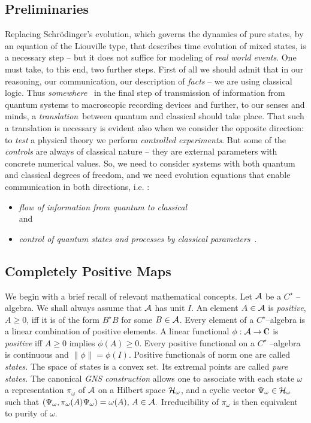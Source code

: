 \documentclass[12pt]{article}
\def\complex{{\kern .1em {\raise .47ex \hbox
{$\scriptscriptstyle
|$}}
\kern -.4em {\rm C}}}
\begin{document}
\subsection{Preliminaries}
Replacing Schr\"odinger's evolution, which governs the dynamics
of pure states, by an equation of the
Liouville type, that describes time evolution of mixed states,
is a necessary step -- but it does not suffice for modeling
of {\em real world events}.  One must take,  to this end,  two further steps. 
First of all we should admit that in our reasoning,  our communication,  our
description of {\em facts} -- we are using classical logic.  Thus {\em somewhere }\
in the final step of transmission of information from quantum systems to
macroscopic recording devices and further, to our senses and minds,
a {\em translation}\ between quantum and classical
 should
take place.  That such a translation is necessary is evident also when we
consider the opposite direction:  to {\em test} a physical theory we perform 
{\em controlled experiments}.  But some of the {\em controls} are always of
classical nature -- they are external parameters with concrete numerical
values.  So,  we need to consider systems with both quantum and classical
degrees of freedom,  and we need evolution equations that enable communication 
in both directions,  i.e. :  \begin{itemize}
\item {\em flow of information from quantum to classical} \\and \item 
{\em control of quantum states and processes by
classical parameters}\ . 
\end{itemize}

\subsection{Completely Positive Maps}
We begin with a brief recall of relevant mathematical concepts.  
Let ${\cal A}$ be a $C^{\star}$ -- algebra.  We shall always assume that $
{\cal A}$ has unit $I$.  An element $A\in {\cal A}$ is {\em positive},  $A\geq 0$, 
iff it is of the form $B^\star B$ for some $B\in {\cal A}$.  Every element of
a $C^{\star}$--algebra is a linear combination of positive elements.  A
linear functional $\phi :  {\cal A} \rightarrow \complex$ is {\em positive} iff 
$A\geq 0$
implies $\phi  (A) \geq 0$.  Every positive functional on a $C^{\star}$
--algebra is continuous and $\| \phi\| = \phi  (I). $ Positive functionals of
norm one are called {\em states}.  The space of states is a convex set.  Its
extremal points are called {\em pure states}.  The canonical
 {\em GNS construction}
allows one to associate with each state $\omega$ a representation $
\pi_\omega $ of ${\cal A}$ on a Hilbert space ${\cal H}_\omega$,  and a
cyclic vector $\Psi_\omega\in{\cal H}_\omega$ such that $ (\Psi_\omega
, \pi_\omega  (A)\Psi_\omega ) = \omega  (A) , \,  A\in {\cal A} . $
Irreducibility of $\pi_\omega$ is then equivalent to purity of $\omega . $
\end{document}
